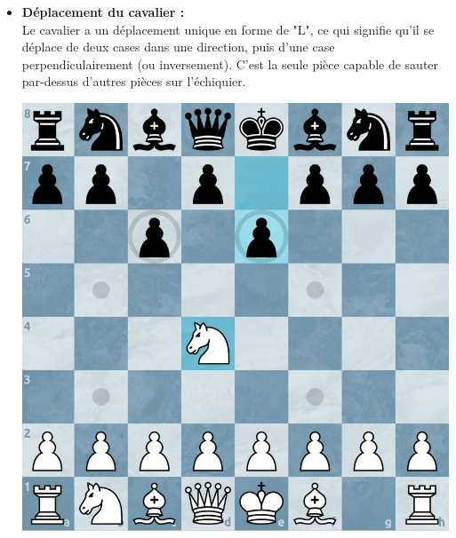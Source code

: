 \documentclass{article}
\begin{document}
\begin{itemize}
    \item \begin{minipage}{0.45\textwidth}
        \textbf{Déplacement du cavalier :} \\
        Le cavalier a un déplacement unique en forme de "L", ce qui signifie qu'il se déplace de deux cases dans une direction,
        puis d'une case perpendiculairement (ou inversement). C'est la seule pièce capable de sauter par-dessus d'autres 
        pièces sur l'échiquier.
    \end{minipage}
    \hspace{0.05\textwidth}
    \begin{minipage}{0.45\textwidth}
        \centering
        \includegraphics[width=\textwidth]{cavalierMove.png}
    \end{minipage}

    \vspace{0.5cm}


\end{itemize}
\end{document}
